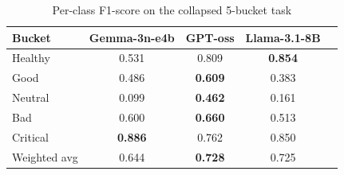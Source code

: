 \documentclass[conference]{IEEEtran}
\makeatletter
\let\end\a@l@end
\makeatother
\begin{document}
\begin{table}[ht]
\centering
\caption{Per-class F1-score on the 10-class severity task}
\label{tab:pe_perclass_f1}
\end{table}

\begin{table}[ht]
\centering
\caption{Per-class F1-score on the collapsed 5-bucket task}
\label{tab:pe_bucket_f1}
\begin{tabular}{lcccc}
\toprule
Bucket & Gemma-3n-e4b & GPT-oss & Llama-3.1-8B \\
\midrule
Healthy  & 0.531          & 0.809          & \textbf{0.854} \\
Good     & 0.486          & \textbf{0.609} & 0.383 \\
Neutral  & 0.099          & \textbf{0.462} & 0.161 \\
Bad      & 0.600          & \textbf{0.660} & 0.513 \\
Critical & \textbf{0.886} & 0.762          & 0.850 \\
\midrule
Weighted avg & 0.644       & \textbf{0.728} & 0.725 \\
\bottomrule
\end{tabular}
\end{table}
\end{document}
